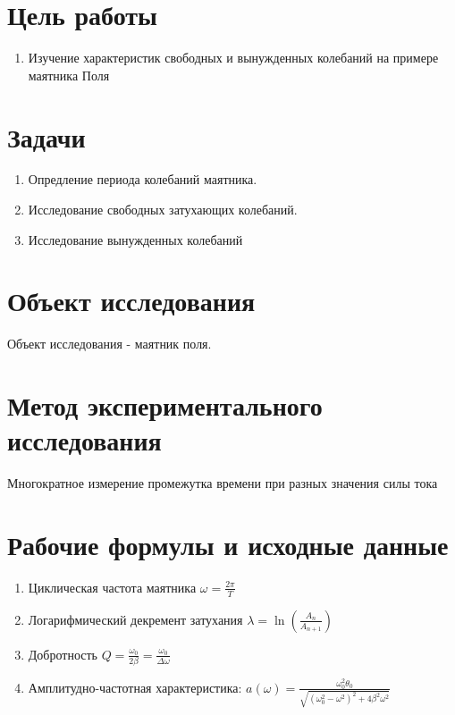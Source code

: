 \section{Цель работы}
\begin{enumerate}
	\item Изучение характеристик свободных и вынужденных колебаний на примере маятника Поля
\end{enumerate}

\section{Задачи}
\begin{enumerate}
	\item Опредление периода колебаний маятника.
	\item Исследование свободных затухающих колебаний.
	\item Исследование вынужденных колебаний
\end{enumerate}

\section{Объект исследования}
Объект исследования - маятник поля.

\section{Метод экспериментального исследования}
Многократное измерение промежутка времени при разных значения силы тока

\section{Рабочие формулы и исходные данные}
\begin{enumerate}
	\item Циклическая частота маятника $\omega = \frac{2\pi}{T}$
	\item Логарифмический декремент затухания $\lambda = \ln \left( \frac{A_n}{A_{n+1}} \right)$
	\item Добротность $Q = \frac{\omega_0}{2 \beta} = \frac{\omega_0}{\Delta \omega}$
	\item Амплитудно-частотная характеристика:
	      $ a(\omega) = \frac{\omega_0^2 \theta_0}{\sqrt{(\omega_0^2 - \omega^2)^2 + 4 \beta^2 \omega^2}} $
\end{enumerate}

